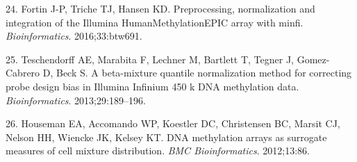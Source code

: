 \documentclass[]{article}
\begin{document}
\leavevmode\hypertarget{ref-Fortin2016}{}%
24. Fortin J-P, Triche TJ, Hansen KD. Preprocessing, normalization and
integration of the Illumina HumanMethylationEPIC array with minfi.
\emph{Bioinformatics}. 2016;33:btw691.

\leavevmode\hypertarget{ref-Teschendorff2013}{}%
25. Teschendorff AE, Marabita F, Lechner M, Bartlett T, Tegner J,
Gomez-Cabrero D, Beck S. A beta-mixture quantile normalization method
for correcting probe design bias in Illumina Infinium 450 k DNA
methylation data. \emph{Bioinformatics}. 2013;29:189--196.

\leavevmode\hypertarget{ref-Houseman2012}{}%
26. Houseman EA, Accomando WP, Koestler DC, Christensen BC, Marsit CJ,
Nelson HH, Wiencke JK, Kelsey KT. DNA methylation arrays as surrogate
measures of cell mixture distribution. \emph{BMC Bioinformatics}.
2012;13:86.
\end{document}
